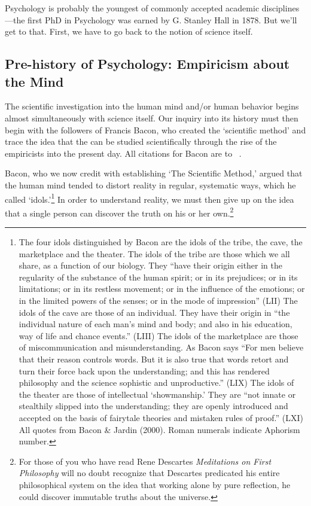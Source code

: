 \begin{refsection}
Psychology is probably the youngest of commonly accepted academic disciplines---the first PhD in Psychology was earned by G. Stanley Hall in 1878. But we'll get to that. First, we have to go back to the notion of science itself.

\subsection{Pre-history of Psychology: Empiricism about the Mind}
\label{pre-historyofpsychology:empiricismaboutthemind}

The scientific investigation into the human mind and\slash or human behavior begins almost simultaneously with science itself. Our inquiry into its history must then begin with the followers of Francis Bacon, who created the `scientific method' and trace the idea that the can be studied scientifically through the rise of the empiricists into the present day. All citations for Bacon are to ~\citep{Bacon:1620ui}.

Bacon, who we now credit with establishing `The Scientific Method,' argued that the human mind tended to distort reality in regular, systematic ways, which he called `idols.'\footnote{The four idols distinguished by Bacon are the idols of the tribe, the cave, the marketplace and the theater. The idols of the tribe are those which we all share, as a function of our biology. They ``have their origin either in the regularity of the substance of the human spirit; or in its prejudices; or in its limitations; or in its restless movement; or in the influence of the emotions; or in the limited powers of the senses; or in the mode of impression'' (LII)
The idols of the cave are those of an individual. They have their origin in ``the individual nature of each man's mind and body; and also in his education, way of life and chance events.'' (LIII)
The idols of the marketplace are those of miscommunication and misunderstanding. As Bacon says ``For men believe that their reason controls words. But it is also true that words retort and turn their force back upon the understanding; and this has rendered philosophy and the science sophistic and unproductive.'' (LIX)
The idols of the theater are those of intellectual `showmanship.' They are ``not innate or stealthily slipped into the understanding; they are openly introduced and accepted on the basis of fairytale theories and mistaken rules of proof.'' (LXI)
All quotes from Bacon \& Jardin (2000). Roman numerals indicate Aphorism number.} In order to understand reality, we must then give up on the idea that a single person can discover the truth on his or her own.\footnote{For those of you who have read Rene Descartes \emph{Meditations on First Philosophy} will no doubt recognize that Descartes predicated his entire philosophical system on the idea that working alone by pure reflection, he could discover immutable truths about the universe.}


\end{refsection}
